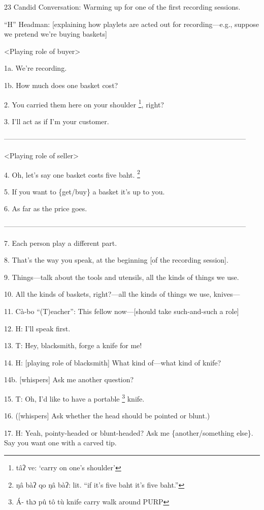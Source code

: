 
23 Candid Conversation: Warming up for one of the first recording sessions.

``H'' Headman: [explaining how playlets are acted out for recording---e.g., suppose
we pretend we're buying baskets]

<Playing role of buyer>

1a. We're recording.

1b. How much does one basket cost?

2. You carried them here on your shoulder \footnote{tâʔ ve: `carry on one's shoulder'}, right?

3. I'll act as if I'm your customer.

------------------------------------------------------------------------------------------------------

<Playing role of seller>

4. Oh, let's say one basket costs five baht. \footnote{ŋâ bàʔ qo ŋâ bàʔ: lit. ``if it's five baht it's five baht.''}

5. If you want to \{get/buy\} a basket it's up to you.

6. As far as the price goes.

------------------------------------------------------------------------------------------------------

7. Each person play a different part.

8. That's the way you speak, at the beginning [of the recording session].

9. Things---talk about the tools and utensils, all the kinds of things we use.

10. All the kinds of baskets, right?---all the kinds of things we use, knives---

11. Cà-bo ``(T)eacher'': This fellow now---[should take such-and-such a role]

12. H: I'll speak first.

13. T: Hey, blacksmith, forge a knife for me!

14. H: [playing role of blacksmith] What kind of---what kind of knife?

14b. [whispers] Ask me another question?

15. T: Oh, I'd like to have a portable \footnote{Á- thɔ pû tô  tù  knife  carry walk around PURP} knife.

16.  ([whispers] Ask whether the head should be pointed or blunt.)

17. H: Yeah, pointy-headed or blunt-headed?  Ask me \{another/something else\}.
Say you want one with a carved tip.

